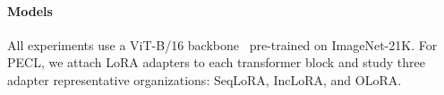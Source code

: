 \documentclass{article}
\theoremstyle{plain}
\theoremstyle{definition}
\theoremstyle{remark}
\begin{document}

\paragraph{Models}

All experiments use a ViT-B/16 backbone~\cite{dosovitskiy2020image} pre-trained on ImageNet-21K. 
For PECL, we attach LoRA adapters to each transformer block and study three adapter  representative organizations: SeqLoRA, IncLoRA, and OLoRA\cite{wang2023orthogonal}.
\end{document}
